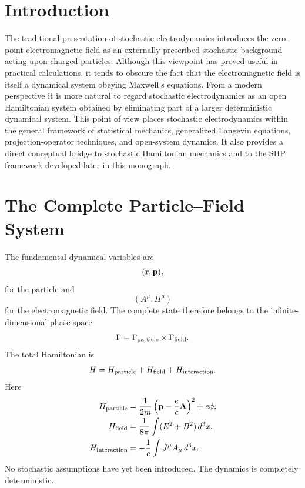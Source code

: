 \section{Introduction}
The traditional presentation of stochastic electrodynamics introduces the
zero-point electromagnetic field as an externally prescribed stochastic
background acting upon charged particles. Although this viewpoint has
proved useful in practical calculations, it tends to obscure the fact
that the electromagnetic field is itself a dynamical system obeying
Maxwell's equations.
From a modern perspective it is more natural to regard stochastic
electrodynamics as an open Hamiltonian system obtained by eliminating
part of a larger deterministic dynamical system.
This point of view places stochastic electrodynamics within the general
framework of statistical mechanics, generalized Langevin equations,
projection-operator techniques, and open-system dynamics.
It also provides a direct conceptual bridge to stochastic Hamiltonian
mechanics and to the SHP framework developed later in this monograph.
\section{The Complete Particle--Field System}
The fundamental dynamical variables are
\[({\bf r},{\bf p}),\]
for the particle and
\[(A^\mu,\Pi^\mu)\]
for the electromagnetic field.
The complete state therefore belongs to the infinite-dimensional phase
space
\begin{equation}
\Gamma=\Gamma_{\rm particle}\times\Gamma_{\rm field}.
\end{equation}
The total Hamiltonian is
\begin{equation}
H=H_{\rm particle}+H_{\rm field}+H_{\rm interaction}.
\label{eq:TotalHamiltonian}
\end{equation}
Here
\begin{align}
H_{\rm particle}&=\frac{1}{2m}\left({\bf p}-\frac{e}{c}{\bf A}\right)^2+e\phi,\\
H_{\rm field}&=\frac{1}{8\pi}\int(E^2+B^2)\,d^3x,\\
H_{\rm interaction}&=-\frac{1}{c}\int J^\mu A_\mu \,d^3x.
\end{align}
No stochastic assumptions have yet been introduced.
The dynamics is completely deterministic.
